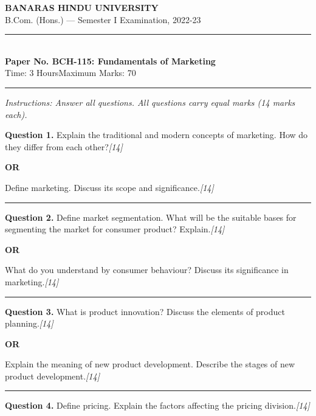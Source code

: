 \documentclass[11pt,a4paper]{article}
\newcommand{\pts}[1]{\hfill   \textit{[#1]}}
\begin{document}
\begin{center}
  {\large\bfseries BANARAS HINDU UNIVERSITY}\\[2pt]
  {\normalsize B.Com. (Hons.) --- Semester I Examination, 2022-23}\\[6pt]
  \rule{0.8\linewidth}{0.5pt}\\[6pt]
  {\large\bfseries Paper No. BCH-115: Fundamentals of Marketing}\\[4pt]
  {\normalsize Time: 3 Hours\hfill Maximum Marks: 70}
\end{center}

\rule{\linewidth}{0.4pt}

\smallskip



\noindent   \textit{Instructions: Answer all questions. All questions carry equal marks (14 marks each).}

\bigskip




\noindent   \textbf{Question 1.}
Explain the traditional and modern concepts of marketing. How do they differ from each other?\pts{14}

\centerline{   \textbf{OR}}

Define marketing. Discuss its scope and significance.\pts{14}

\medskip\rule{\linewidth}{0.2pt}




\noindent   \textbf{Question 2.}
Define market segmentation. What will be the suitable bases for segmenting the market for consumer product? Explain.\pts{14}

\centerline{   \textbf{OR}}

What do you understand by consumer behaviour? Discuss its significance in marketing.\pts{14}

\medskip\rule{\linewidth}{0.2pt}




\noindent   \textbf{Question 3.}
What is product innovation? Discuss the elements of product planning.\pts{14}

\centerline{   \textbf{OR}}

Explain the meaning of new product development. Describe the stages of new product development.\pts{14}

\medskip\rule{\linewidth}{0.2pt}




\noindent   \textbf{Question 4.}
Define pricing. Explain the factors affecting the pricing division.\pts{14}
\end{document}
